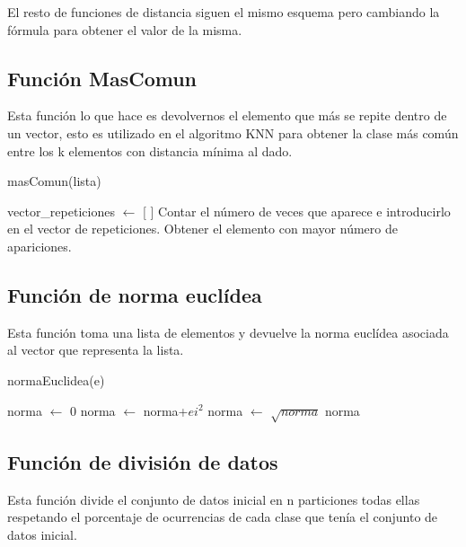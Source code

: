 \documentclass[12pt,a4paper]{article}
\begin{document}
	El resto de funciones de distancia siguen el mismo esquema pero cambiando la fórmula para obtener el valor de la misma.

	\subsection{Función MasComun}

	Esta función lo que hace es devolvernos el elemento que más se repite dentro de un vector, esto es utilizado en el algoritmo KNN para obtener la clase más común entre los k elementos con distancia mínima al dado.

	\begin{algorithm}
		\caption{masComun(lista)}
		\begin{algorithmic}
			\STATE vector\_repeticiones $\leftarrow$ [ ]
				\STATE Contar el número de veces que aparece e introducirlo en el vector de repeticiones.
			\ENDFOR
			\STATE Obtener el elemento con mayor número de apariciones.
		\end{algorithmic}
	\end{algorithm}

	\subsection{Función de norma euclídea}

	Esta función toma una lista de elementos y devuelve la norma euclídea asociada al vector que representa la lista.

	\begin{algorithm}
		\caption{normaEuclidea(e)}
		\begin{algorithmic}
			\STATE norma $\leftarrow$ 0
			\FOR{ei en e}
				\STATE norma $\leftarrow$ norma+$ei^2$
			\ENDFOR
			\STATE norma $\leftarrow$ $\sqrt{norma}$
			\RETURN norma
		\end{algorithmic}
	\end{algorithm}

	\subsection{Función de división de datos}

	Esta función divide el conjunto de datos inicial en n particiones todas ellas respetando el porcentaje de ocurrencias de cada clase que tenía el conjunto de datos inicial.
\end{document}
